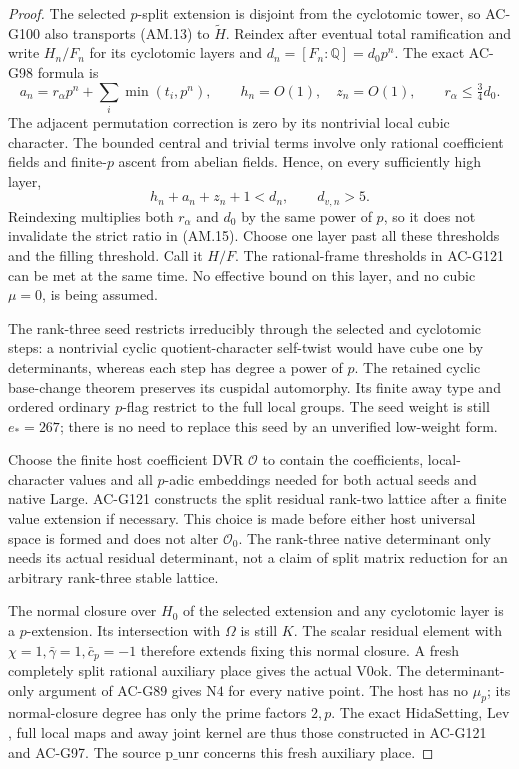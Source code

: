 \begin{proof}
The selected \(p\)-split extension is disjoint from the
cyclotomic tower, so AC-G100 also transports (AM.13) to
\(\widetilde H\).  Reindex after eventual total ramification
and write \(H_n/F_n\) for its cyclotomic layers and
\(d_n=[F_n:\mathbb Q]=d_0p^n\).  The exact AC-G98 formula is
\[
 a_n=r_\alpha p^n+\sum_i\min(t_i,p^n),\qquad
 h_n=O(1),\quad z_n=O(1),\qquad r_\alpha\le\tfrac34d_0 .
 \tag{AM.15}
\]
The adjacent permutation correction is zero by its nontrivial
local cubic character.  The bounded central and trivial terms
involve only rational coefficient fields and finite-\(p\)
ascent from abelian fields.  Hence, on every sufficiently
high layer,
\[
                    h_n+a_n+z_n+1<d_n,\qquad d_{v,n}>5 .
 \tag{AM.16}
\]
Reindexing multiplies both \(r_\alpha\) and \(d_0\) by the
same power of \(p\), so it does not invalidate the strict
ratio in (AM.15).
Choose one layer past all these thresholds and the filling
threshold.  Call it \(H/F\).  The rational-frame thresholds
in AC-G121 can be met at the same time.  No effective bound
on this layer, and no cubic \(\mu=0\), is being assumed.

The rank-three seed restricts irreducibly through the
selected and cyclotomic steps: a nontrivial cyclic
quotient-character self-twist would have cube one by
determinants, whereas each step has degree a power of \(p\).
The retained cyclic base-change theorem preserves its
cuspidal automorphy.  Its finite away type and ordered
ordinary \(p\)-flag restrict to the full local groups.
The seed weight is still \(e_*=267\); there is no
need to replace this seed by an unverified low-weight form.

Choose the finite host coefficient DVR \(\mathcal O\)
to contain the coefficients, local-character values and
all \(p\)-adic embeddings needed for both actual seeds
and native \(\mathrm{Large}\).  AC-G121 constructs the
split residual rank-two lattice after a finite value
extension if necessary.  This choice is made before
either host universal space is formed and does not
alter \(\mathcal O_0\).
The rank-three native determinant only needs its actual
residual determinant, not a claim of split matrix reduction
for an arbitrary rank-three stable lattice.

The normal closure over \(H_0\) of the selected extension
and any cyclotomic layer is a \(p\)-extension.
Its intersection with \(\Omega\) is still \(K\).
The scalar residual element with
\(\chi=1,\bar\gamma=1,\bar c_p=-1\) therefore extends
fixing this normal closure.  A fresh completely split
rational auxiliary place gives the actual \(\mathrm{V0ok}\).
The determinant-only argument of AC-G89 gives \(\mathrm{N4}\)
for every native point.  The host has no \(\mu_p\);
its normal-closure degree has only the prime factors \(2,p\).
The exact \(\mathrm{HidaSetting}\), \(\mathrm{Lev}\),
full local maps and away joint kernel are thus those
constructed in AC-G121 and AC-G97.  The source
\(\mathrm{p\_unr}\) concerns this fresh auxiliary place.


\end{proof}
